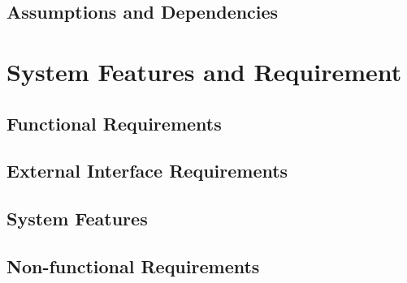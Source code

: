 \documentclass[a4paper]{article}
\begin{document}
    \subsection{Assumptions and Dependencies}
    \section{System Features and Requirement}
    \subsection{Functional Requirements}
    \subsection{External Interface Requirements}
    \subsection{System Features}
    \subsection{Non-functional Requirements}
\end{document}
